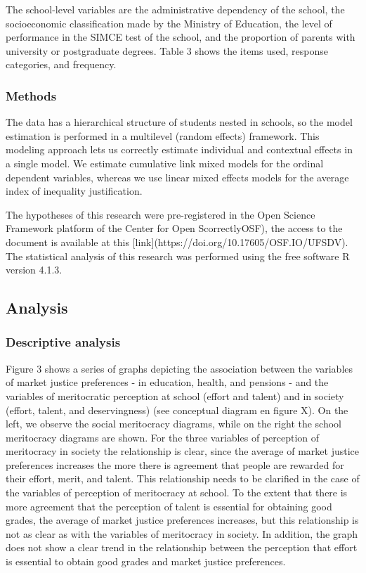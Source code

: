 \documentclass[
  letterpaper,
  DIV=11,
  numbers=noendperiod]{scrartcl}
\begin{document}
The school-level variables are the administrative dependency of the
school, the socioeconomic classification made by the Ministry of
Education, the level of performance in the SIMCE test of the school, and
the proportion of parents with university or postgraduate degrees. Table
3 shows the items used, response categories, and frequency.

\hypertarget{methods-1}{%
\subsubsection{Methods}\label{methods-1}}

The data has a hierarchical structure of students nested in schools, so
the model estimation is performed in a multilevel (random effects)
framework. This modeling approach lets us correctly estimate individual
and contextual effects in a single model. We estimate cumulative link
mixed models for the ordinal dependent variables, whereas we use linear
mixed effects models for the average index of inequality justification.

The hypotheses of this research were pre-registered in the Open Science
Framework platform of the Center for Open ScorrectlyOSF), the access to
the document is available at this
{[}link{]}(https://doi.org/10.17605/OSF.IO/UFSDV). The statistical
analysis of this research was performed using the free software R
version 4.1.3.

\hypertarget{analysis}{%
\subsection{Analysis}\label{analysis}}

\hypertarget{descriptive-analysis}{%
\subsubsection{Descriptive analysis}\label{descriptive-analysis}}

Figure 3 shows a series of graphs depicting the association between the
variables of market justice preferences - in education, health, and
pensions - and the variables of meritocratic perception at school
(effort and talent) and in society (effort, talent, and deservingness)
(see conceptual diagram en figure X). On the left, we observe the social
meritocracy diagrams, while on the right the school meritocracy diagrams
are shown. For the three variables of perception of meritocracy in
society the relationship is clear, since the average of market justice
preferences increases the more there is agreement that people are
rewarded for their effort, merit, and talent. This relationship needs to
be clarified in the case of the variables of perception of meritocracy
at school. To the extent that there is more agreement that the
perception of talent is essential for obtaining good grades, the average
of market justice preferences increases, but this relationship is not as
clear as with the variables of meritocracy in society. In addition, the
graph does not show a clear trend in the relationship between the
perception that effort is essential to obtain good grades and market
justice preferences.
\end{document}

